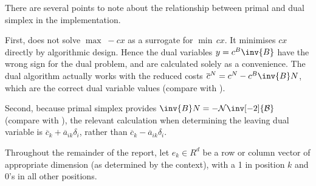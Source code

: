 There are several points to note about the relationship between primal and dual
simplex in the \dylp implementation.

First, \dylp does not solve $\max \; -cx$ as a surrogate for $\min \, cx$.
It minimises $cx$ directly by algorithmic design.
Hence the dual variables $y = c^B \inv{B}$ have the wrong sign for the dual
problem, and are calculated solely as a convenience.
The dual algorithm actually works with the reduced costs
$\overline{c}^N = c^N - c^B \inv{B} N$, which are the correct dual variable
values
(compare  with ).

Second, because primal simplex provides
$\inv{B} N = - \mathcal{N} \inv[-2]{\mathcal{B}}$
(compare  with ),
the relevant calculation when determining the leaving dual variable is
$\overline{c}_k + \overline{a}_{ik} \delta_i$, rather than
$ \overline{c}_k - \overline{a}_{ik} \delta_i$.

Throughout the remainder of the report, let $e_k \in R^d$ be a row or
column vector of appropriate
dimension (as determined by the context), with a 1 in
position $k$ and 0's in all other positions.
